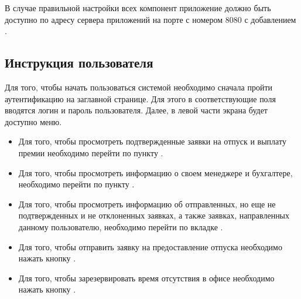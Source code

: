 В случае правильной настройки всех компонент приложение должно быть доступно по адресу сервера приложений на порте с номером $8080$
с добавлением .

\subsection{Инструкция пользователя}

Для того, чтобы начать пользоваться системой необходимо сначала пройти аутентификацию на заглавной странице. Для этого в соответствующие 
поля вводятся логин и пароль пользователя. Далее, в левой части экрана будет доступно меню. 
\begin{itemize}
    \item Для того, чтобы просмотреть подтвержденные заявки на отпуск и выплату премии необходимо перейти по пункту .
    \item Для того, чтобы просмотреть информацию о своем менеджере и бухгалтере, необходимо перейти по пункту .
    \item Для того, чтобы просмотреть информацию об отправленных, но еще не подтвержденных и не отклоненных заявках, а также заявках,
        направленных данному пользователю, необходимо перейти по вкладке .
    \item Для того, чтобы отправить заявку на предоставление отпуска необходимо нажать кнопку .
    \item Для того, чтобы зарезервировать время отсутствия в офисе необходимо нажать кнопку .
\end{itemize}
